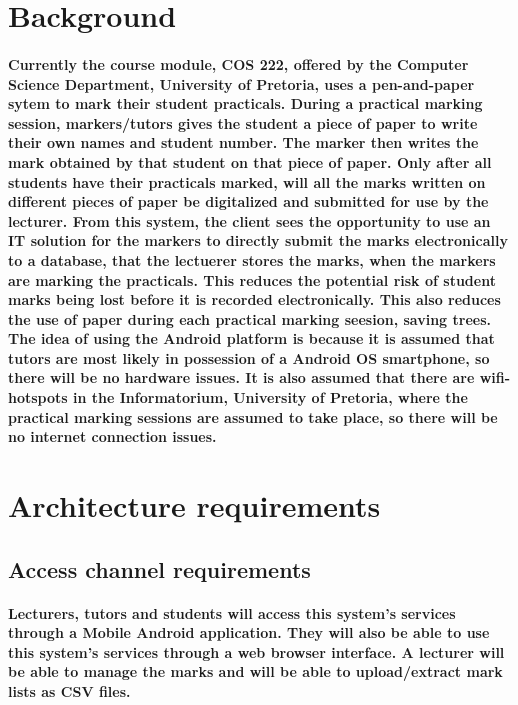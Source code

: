 \documentclass[12pt]{article}
\begin{document}
  \section{Background}
  \paragraph*{Currently the course module, COS 222, offered by the Computer Science Department, University of Pretoria, uses a pen-and-paper sytem to mark their student practicals. During a practical marking session, markers/tutors gives the student a piece of paper to write their own names and student number. The marker then writes the mark obtained by that student on that piece of paper. Only after all students have their practicals marked, will all the marks written on different pieces of paper be digitalized and submitted for use by the lecturer. From this system, the client sees the opportunity to use an IT solution for the markers to directly submit the marks electronically to a database, that the lectuerer stores the marks, when the markers are marking the practicals. This reduces the potential risk of student marks being lost before it is recorded electronically. This also reduces the use of paper during each practical marking seesion, saving trees. The idea of using the Android platform is because it is assumed that tutors are most likely in possession of a Android OS smartphone, so there will be no hardware issues. It is also assumed that there are wifi-hotspots in the Informatorium, University of Pretoria, where the practical marking sessions are assumed to take place, so there will be no internet connection issues.}
  \section{Architecture requirements}
  \subsection{Access channel requirements}
  \paragraph*{Lecturers, tutors and students will access this system's services through a Mobile Android application. They will also be able to use this system's services through a web browser interface. A lecturer will be able to manage the marks and will be able to upload/extract mark lists as CSV files.}
\end{document}
